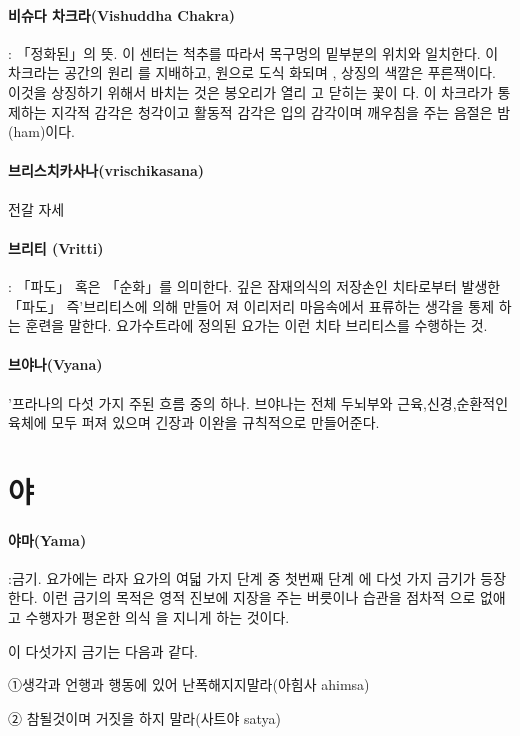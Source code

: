 \documentclass[12pt, a4paper, oneside]{book}
\let\stdsection\section
\renewcommand\section{\newpage\stdsection}
\begin{document}
\paragraph{비슈다 차크라(Vishuddha Chakra)} : 「정화된」의 뜻. 이 센터는 척추를 따라서 목구멍의 밑부분의 위치와 일치한다.  이 차크라는 공간의 원리 를 지배하고, 원으로 도식 화되며 ,  상징의 색깔은 푸른잭이다. 이것을 상징하기 위해서 바치는 것은 봉오리가 열리 고 닫히는 꽃이 다. 이 차크라가 통제하는 지각적 감각은 청각이고 활동적 감각은 입의 감각이며 깨우침을 주는 음절은 밤(ham)이다.

\paragraph{브리스치카사나(vrischikasana)} 
		전갈 자세

\paragraph{브리티 (Vritti)} : 「파도」 혹은 「순화」를 의미한다. 깊은 잠재의식의 저장손인 치타로부터 발생한 「파도」 즉'브리티스에 의해 만들어 져 이리저리 마음속에서 표류하는 생각을 통제  하는 훈련을 말한다. 요가수트라에 정의된 요가는 이런 치타 브리티스를 수행하는 것.

\paragraph{브야나(Vyana)} '프라나의 다섯 가지 주된 흐름 중의 하나. 브야나는 전체 두뇌부와 근육,신경,순환적인 육체에 모두 퍼져 있으며 긴장과 이완을 규칙적으로 만들어준다.


\newpage
\section{야}

\paragraph{야마(Yama)} :금기. 요가에는 라자 요가의 여덟 가지 단계 중 첫번째 단계 에 다섯 가지 금기가 등장한다. 이런 금기의 목적은 영적 진보에 지장을 주는 버릇이나 습관을 점차적    으로 없애고 수행자가 평온한 의식 을 지니게 하는 것이다.

   이 다섯가지 금기는 다음과 같다.

   ①생각과 언행과 행동에 있어 난폭해지지말라(아힘사 ahimsa)

   ② 참될것이며 거짓을 하지 말라(사트야 satya)
\end{document}

